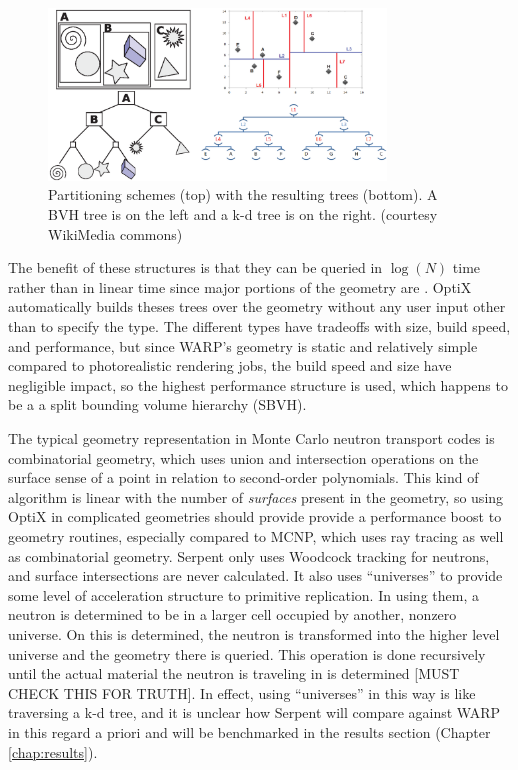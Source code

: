 \begin{figure}[h!] 
\centering
\includegraphics[width=0.8\textwidth, trim= 8cm 0cm 0cm 0cm ]{graphics/bvh_kd.eps}
\caption{Partitioning schemes (top) with the resulting trees (bottom). A BVH tree is on the left and a k-d tree is on the right. (courtesy WikiMedia commons)  \label{bvh_kd}}
\end{figure}

The benefit of these structures is that they can be queried in $\log(N)$ time rather than in linear time since major portions of the geometry are \cite{something}.  OptiX automatically builds theses trees over the geometry without any user input other than to specify the type.  The different types have tradeoffs with size, build speed, and performance, but since WARP's geometry is static and relatively simple compared to photorealistic rendering jobs, the build speed and size have negligible impact, so the highest performance structure is used, which happens to be a a split bounding volume hierarchy (SBVH).  

The typical geometry representation in Monte Carlo neutron transport codes is combinatorial geometry, which uses union and intersection operations on the surface sense  of a point in relation to second-order polynomials.  This kind of algorithm is linear with the number of \emph{surfaces} present in the geometry, so using OptiX in complicated geometries should provide provide a performance boost to geometry routines, especially compared to MCNP, which uses ray tracing as well as combinatorial geometry.  Serpent only uses Woodcock tracking for neutrons, and surface intersections are never calculated.  It also uses ``universes'' to provide some level of acceleration structure to primitive replication.  In using them, a neutron is determined to be in a larger cell occupied by another, nonzero universe.  On this is determined, the neutron is transformed into the higher level universe and the geometry there is queried.  This operation is done recursively until the actual material the neutron is traveling in is determined \cite{jaakko}[MUST CHECK THIS FOR TRUTH].  In effect, using ``universes'' in this way is like traversing a k-d tree, and it is unclear how Serpent will compare against WARP in this regard a priori and will be benchmarked in the results section (Chapter \ref{chap:results}).

